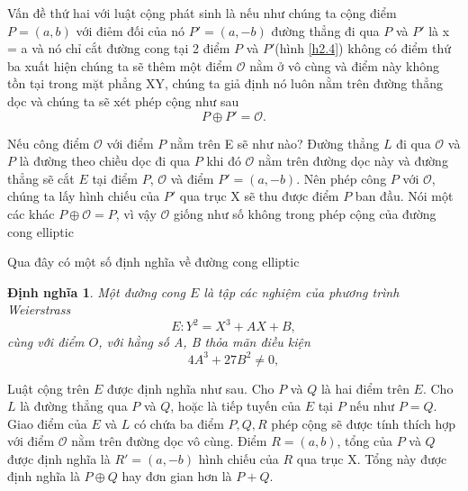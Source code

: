 \documentclass[a4paper,12pt]{report}
\newtheorem{definition}{Định nghĩa}[chapter]
\begin{document}
Vấn đề thứ hai với luật cộng phát sinh là nếu như chúng ta cộng điểm $P = (a, b)$ với điẻm đối của nó  $P' = (a, -b)$ đường thẳng đi qua $P$ và $P'$ là x = a và nó chỉ cắt đường cong tại 2 điểm $P$ và $P'$(hình \ref{h2.4}) không có điểm thứ ba xuất hiện chúng ta sẽ thêm một điểm $\mathcal{O}$ nằm ở vô cùng và điểm này không tồn tại trong mặt phẳng XY, chúng ta giả định nó luôn nằm trên đường thẳng dọc và chúng ta sẽ xét phép cộng như sau
\begin{displaymath}
P \oplus P' = \mathcal{O}.
\end{displaymath}

Nếu công điểm $\mathcal{O}$ với điểm $P$ nằm trên E sẽ như nào? Đường thẳng $L$ đi qua $\mathcal{O}$ và $P$ là đường theo chiều dọc đi qua $P$ khi đó $\mathcal{O}$ nằm trên đường dọc này và đường thẳng sẽ cắt $E$ tại điểm $P$, $\mathcal{O}$ và điểm $P' = (a , -b)$. Nên phép công $P$ với $\mathcal{O}$, chúng ta lấy hình chiếu của $P'$ qua trục X sẽ thu được điểm $P$ ban đầu. Nói một các khác $P \oplus \mathcal{O} = P$, vì vậy $\mathcal{O}$ giống như số không trong phép cộng của đường cong elliptic

Qua đây có một số định nghĩa về đường cong elliptic
\\[6pt]
\begin{definition}
Một đường cong $E$ là tập các nghiệm của phương trình Weierstrass
\begin{displaymath}
E: Y^2 = X^3 + AX + B,
\end{displaymath}
cùng với điểm $O$, với hằng số A, B thỏa mãn điều kiện
\begin{displaymath}
4A^3 + 27B^2 \neq 0,
\end{displaymath}
\end{definition}

Luật cộng trên $E$ được định nghĩa như sau. Cho $P$ và $Q$ là hai điểm trên $E$. Cho $L$ là đường thẳng qua $P$ và $Q$, hoặc là tiếp tuyến của $E$ tại $P$ nếu như $P = Q$. Giao điểm của $E$ và $L$ có chứa ba điểm $P, Q, R$ phép cộng sẽ được tính thích hợp với điểm $\mathcal{O}$ nằm trên đường dọc vô cùng. Điểm $R = (a, b)$, tổng của $P$ và $Q$ được định nghĩa là $R' = (a, -b)$ hình chiếu của $R$ qua trục X. Tổng này được định nghĩa là $P \oplus Q$ hay đơn gian hơn là $P + Q$.
\end{document}
